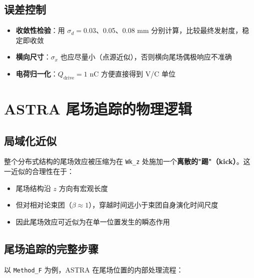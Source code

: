 \documentclass[a4paper,11pt]{article}
\begin{document}
\subsection{误差控制}

\begin{itemize}
  \item \textbf{收敛性检验}：用 $\sigma_d = 0.03$、0.05、0.08 mm 分别计算，比较最终发射度，稳定即收敛
  \item \textbf{横向尺寸}：$\sigma_x$ 也应尽量小（点源近似），否则横向尾场偶极响应不准确
  \item \textbf{电荷归一化}：$Q_{\text{drive}} = 1$ nC 方便直接得到 V/C 单位
\end{itemize}

\newpage
\section{ASTRA 尾场追踪的物理逻辑}

\subsection{局域化近似}

整个分布式结构的尾场效应被压缩为在 \texttt{Wk\_z} 处施加一个\textbf{离散的"踢"（kick）}。这一近似的合理性在于：

\begin{itemize}
  \item 尾场结构沿 $z$ 方向有宏观长度
  \item 但对相对论束团（$\beta \approx 1$），穿越时间远小于束团自身演化时间尺度
  \item 因此尾场效应可近似为在单一位置发生的瞬态作用
\end{itemize}

\subsection{尾场追踪的完整步骤}

以 \texttt{Method\_F} 为例，ASTRA 在尾场位置的内部处理流程：
\end{document}
